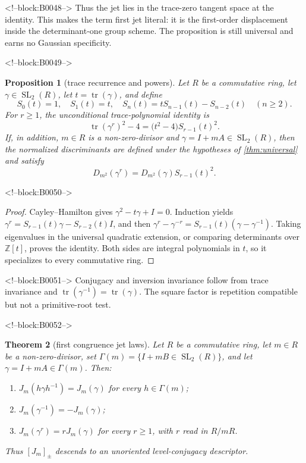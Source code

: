 \documentclass[11pt,a4paper]{article}
\newtheorem{theorem}{Theorem}[section]
\newtheorem{proposition}[theorem]{Proposition}
\theoremstyle{definition}
\theoremstyle{remark}
\newcommand{\SL}{\operatorname{SL}}
\newcommand{\tr}{\operatorname{tr}}
\begin{document}
<!--block:B0048-->
Thus the jet lies in the trace-zero tangent space at the identity. This makes the term first jet literal: it is the first-order displacement inside the determinant-one group scheme. The proposition is still universal and earns no Gaussian specificity.

<!--block:B0049-->
\begin{proposition}[trace recurrence and powers]\label{prop:powerdisc}
Let \(R\) be a commutative ring, let \(\gamma\in\SL_2(R)\), let \(t=\tr(\gamma)\), and define
\[
 S_0(t)=1,\quad S_1(t)=t,\quad
 S_n(t)=tS_{n-1}(t)-S_{n-2}(t)\quad(n\ge2).
\]
For \(r\ge1\), the unconditional trace-polynomial identity is
\[
 \tr(\gamma^r)^2-4=\bigl(t^2-4\bigr)S_{r-1}(t)^2.
\]
If, in addition, \(m\in R\) is a non-zero-divisor and \(\gamma=I+mA\in\SL_2(R)\), then the normalized discriminants are defined under the hypotheses of \cref{thm:universal} and satisfy
\[
 D_{m^2}(\gamma^r)=D_{m^2}(\gamma)S_{r-1}(t)^2.
\]
\end{proposition}

<!--block:B0050-->
\begin{proof}
Cayley--Hamilton gives \(\gamma^2-t\gamma+I=0\). Induction yields \(\gamma^r=S_{r-1}(t)\gamma-S_{r-2}(t)I\), and then
\(\gamma^r-\gamma^{-r}=S_{r-1}(t)(\gamma-\gamma^{-1})\).
Taking eigenvalues in the universal quadratic extension, or comparing determinants over \(\mathbb Z[t]\), proves the identity. Both sides are integral polynomials in \(t\), so it specializes to every commutative ring.
\end{proof}

<!--block:B0051-->
Conjugacy and inversion invariance follow from trace invariance and \(\tr(\gamma^{-1})=\tr(\gamma)\). The square factor is repetition compatible but not a primitive-root test.

<!--block:B0052-->
\begin{theorem}[first congruence jet laws]\label{thm:jet}
Let \(R\) be a commutative ring, let \(m\in R\) be a non-zero-divisor,
set \(\Gamma(m)=\{I+mB\in\SL_2(R)\}\), and let
\(\gamma=I+mA\in\Gamma(m)\). Then:
\begin{enumerate}[label=(\alph*)]
 \item \(J_m(h\gamma h^{-1})=J_m(\gamma)\) for every \(h\in\Gamma(m)\);
 \item \(J_m(\gamma^{-1})=-J_m(\gamma)\);
 \item \(J_m(\gamma^r)=rJ_m(\gamma)\) for every \(r\ge1\), with \(r\) read in \(R/mR\).
\end{enumerate}
Thus \([J_m]_{\pm}\) descends to an unoriented level-conjugacy descriptor.
\end{theorem}
\end{document}
